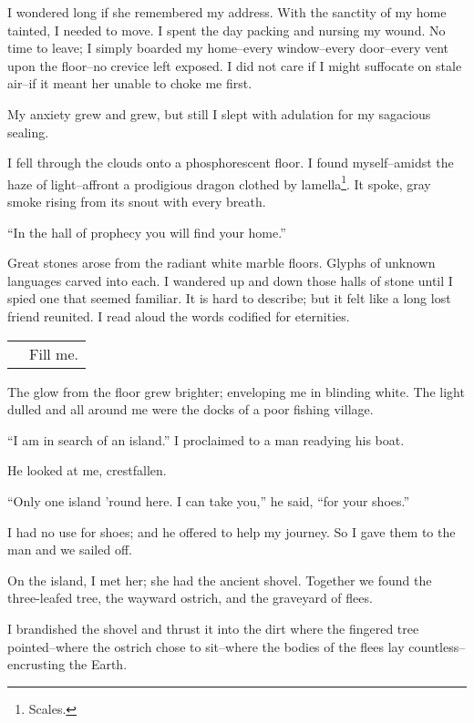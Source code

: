 \documentclass{article}
\begin{document}
I wondered long if she remembered my address.
With the sanctity of my home tainted, I needed to move.
I spent the day packing and nursing my wound.
No time to leave; I simply boarded my home--every
window--every door--every vent upon the floor--no
crevice left exposed.
I did not care if I might suffocate on stale air--if
it meant her unable to choke me first.


My anxiety grew and grew, but still I slept
with adulation for my sagacious sealing.
\vvvv


\noindent
I fell through the clouds onto a phosphorescent floor.
I found myself--amidst the haze of light--affront
a prodigious dragon clothed by lamella\footnote{Scales.}. %
It spoke, gray smoke rising from its snout with every breath.
\VV


``In the hall of prophecy you will find your home.''
\VV


\noindent
Great stones arose from the radiant white marble floors.
Glyphs of unknown languages carved into each.
I wandered up and down those halls of stone
until I spied one that seemed familiar.
It is hard to describe; but it felt like a long lost friend
reunited.  I read aloud the words codified for eternities.
\VV


\begin{tabular}{ll}
& Fill me. \\
\end{tabular}
\vspace*{3ex}


\noindent
The glow from the floor grew brighter;
enveloping me in blinding white.
The light dulled and
all around me were the docks of a poor fishing village.
\VV


``I am in search of an island.''
I proclaimed to a man readying his boat.
\VV


\noindent
He looked at me, crestfallen.
\VV


``Only one island 'round here.
I can take you,'' he said, ``for your shoes.''
\VV


\noindent
I had no use for shoes; and he offered to help my journey.
So I gave them to the man and we sailed off.


On the island, I met her; she had the ancient shovel.
Together we found the three-leafed tree, the
wayward ostrich, and the graveyard of flees.


I brandished the shovel and thrust it into the dirt
where the fingered tree pointed--where the ostrich
chose to sit--where the bodies of the flees lay
countless--encrusting the Earth.
\end{document}
